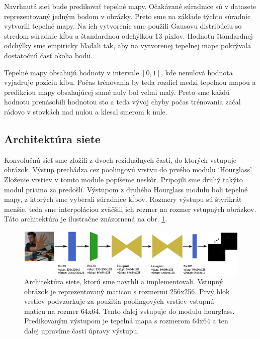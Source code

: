 Navrhnutá sieť bude predikovať tepelné mapy. Očakávané súradnice sú v datasete reprezentovaný jedným bodom v obrázky. Preto sme na základe týchto súradníc vytvorili tepelné mapy. Na ich vytvorenie sme použili Gausovu distribúciu so stredom súradníc kĺbu a štandardnou odchýlkou 13 pixlov. Hodnotu štandardnej odchýlky sme empiricky hľadali tak, aby na vytvorenej tepelnej mape pokrývala dostatočnú časť okolia bodu. 

Tepelné mapy obsahujú hodnoty v intervale $\left[0, 1 \right]$, kde nenulová hodnota vyjadruje pozíciu kĺbu. Počas trénovania by teda rozdiel medzi tepelnou mapou a predikciou mapy obsahujúcej samé nuly bol veľmi malý. Preto sme každú hodnotu prenásobili hodnotou sto a teda vývoj chyby počas trénovania začal rádovo v stovkách nad nulou a klesal smerom k nule. 

\subsection{Architektúra siete}
Konvolučnú sieť sme zložili z dvoch reziduálnych častí, do ktorých vstupuje obrázok. Výstup prechádza cez poolingovú vrstvu do prvého modulu `Hourglass'. Zloženie vrstiev v tomto module popíšeme neskôr. Pripojili sme druhý takýto modul priamo za predošlí. Výstupom z druhého Hourglass modulu boli tepelné mapy, z ktorých sme vyberali súradnice kĺbov. Rozmery výstupu sú štyrikrát menšie, teda sme interpoláciou zväčšili ich rozmer na rozmer vstupných obrázkov. Táto architektúra je ilustračne znázornená na obr. \ref{img:our_architecture}. 

\begin{figure}[H]
	\begin{center}
		\includegraphics[width=\textwidth]{images/our_architecture.jpg}
		\caption{Architektúra siete, ktorú sme navrhli a implementovali. Vstupný obrázok je reprezentovaný maticou s rozmermi 256x256. Prvý blok vrstiev podvzorkuje za použitia poolingových vrstiev vstupnú maticu na rozmer 64x64. Tento ďalej vstupuje do modulu hourglass. Predikovaným výstupom je tepelná mapa s rozmerom 64x64 a ten ďalej upravíme časti úpravy výstupu.}
		\label{img:our_architecture}
	\end{center}
\end{figure}

